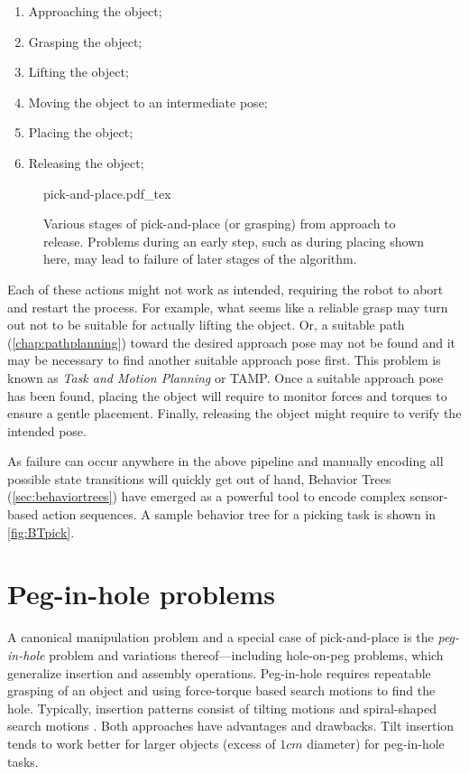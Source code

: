 \begin{enumerate}
\item Approaching the object;
\item Grasping the object;
\item Lifting the object;
\item Moving the object to an intermediate pose;
\item Placing the object;
\item Releasing the object;
\end{enumerate}

\begin{figure}
	\centering
    \def\svgwidth{0.8\textwidth}
    {pick-and-place.pdf_tex}
    \caption{Various stages of pick-and-place (or grasping) from approach to release. Problems during an early step, such as during placing shown here, may lead to failure of later stages of the algorithm.\label{fig:pick-and-place}}
\end{figure}

Each of these actions might not work as intended, requiring the robot to abort and restart the process. For example, what seems like a reliable grasp may turn out not to be suitable for actually lifting the object. Or, a suitable path (\cref{chap:pathplanning}) toward the desired approach pose may not be found and it may be necessary to find another suitable approach pose first. This problem is known as \textsl{Task and Motion Planning} or TAMP. Once a suitable approach pose has been found, placing the object will require to monitor forces and torques to ensure a gentle placement. Finally, releasing the object might require to verify the intended pose.

As failure can occur anywhere in the above pipeline and manually encoding all possible state transitions will quickly get out of hand,  Behavior Trees (\cref{sec:behaviortrees}) have emerged as a powerful tool to encode complex sensor-based action sequences. A sample behavior tree for a picking task is shown in \cref{fig:BTpick}.

\section{Peg-in-hole problems}\label{sec:peginhole}

A canonical manipulation problem and a special case of pick-and-place is the \textsl{peg-in-hole} problem and variations thereof---including hole-on-peg problems, which generalize insertion and assembly operations. Peg-in-hole requires repeatable grasping of an object and using force-torque based search motions to find the hole.
%
Typically, insertion patterns consist of tilting motions and spiral-shaped search motions \cite{watson2020autonomous}. Both approaches have advantages and drawbacks. Tilt insertion tends to work better for larger objects (excess of $1cm$ diameter) for peg-in-hole tasks.


